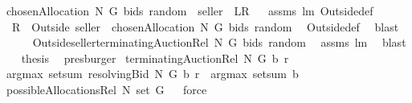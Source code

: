 \begin{isabellebody}
{\isacharbraceleft}chosenAllocation{\isacharprime}\ N\ G\ bids\ random\ {\isacharminus}{\isacharminus}\ {\isacharparenleft}seller{\isacharparenright}{\isacharbraceright}{\isachardoublequoteclose}\ {\isacharparenleft}\ {\isachardoublequoteopen}{\isacharquery}L{\isacharequal}{\isacharquery}R{\isachardoublequoteclose}{\isacharparenright}%
\isadelimproof
\ %
\endisadelimproof
%
\isatagproof
{}\isamarkupfalse%
\ assms\ lm{}{}\ Outside{\isacharunderscore}def\ \isanewline
{}\isamarkupfalse%
\ {\isacharminus}\isanewline
{}\isamarkupfalse%
\ {\isachardoublequoteopen}{\isacharquery}R\ {\isacharequal}\ Outside{\isacharprime}\ {\isacharbraceleft}seller{\isacharbraceright}\ {\isacharbackquote}\ {\isacharbraceleft}chosenAllocation{\isacharprime}\ N\ G\ bids\ random{\isacharbraceright}{\isachardoublequoteclose}\ \isamarkupfalse%
\ Outside{\isacharunderscore}def\ \isanewline
{}\isamarkupfalse%
\ blast\ \isanewline
{}\isamarkupfalse%
\ \isamarkupfalse%
\ {\isachardoublequoteopen}{\isachardot}{\isachardot}{\isachardot}\ {\isacharequal}\ {\isacharparenleft}Outside{\isacharprime}{\isacharbraceleft}seller{\isacharbraceright}{\isacharparenright}{\isacharbackquote}{\isacharparenleft}terminatingAuctionRel\ N\ G\ bids\ random{\isacharparenright}{\isachardoublequoteclose}\ \isamarkupfalse%
\ assms\ lm{}{}\ \isanewline
{}\isamarkupfalse%
\ blast\isanewline
{}\isamarkupfalse%
\ \isamarkupfalse%
\ {\isacharquery}thesis\ \isamarkupfalse%
\ presburger\isanewline
{}\isamarkupfalse%
%
\endisatagproof
{\isafoldproof}%
%
\isadelimproof
%
\endisadelimproof
\isanewline
\isanewline
\isanewline
{}\isamarkupfalse%
\ {\isachardoublequoteopen}terminatingAuctionRel\ N\ G\ b\ r\ {\isacharequal}\ \isanewline
{\isacharparenleft}{\isacharparenleft}argmax\ {\isacharparenleft}setsum\ {\isacharparenleft}resolvingBid{\isacharprime}\ N\ G\ b\ {\isacharparenleft}r{\isacharparenright}{\isacharparenright}{\isacharparenright}{\isacharparenright}\ {\isasymcirc}\ {\isacharparenleft}argmax\ {\isacharparenleft}setsum\ b{\isacharparenright}{\isacharparenright}{\isacharparenright}\isanewline
{\isacharparenleft}possibleAllocationsRel\ N\ {\isacharparenleft}set\ G{\isacharparenright}{\isacharparenright}{\isachardoublequoteclose}%
\isadelimproof
\ %
\endisadelimproof
%
\isatagproof
{}\isamarkupfalse%
\ force%
\endisatagproof

\end{isabellebody}
